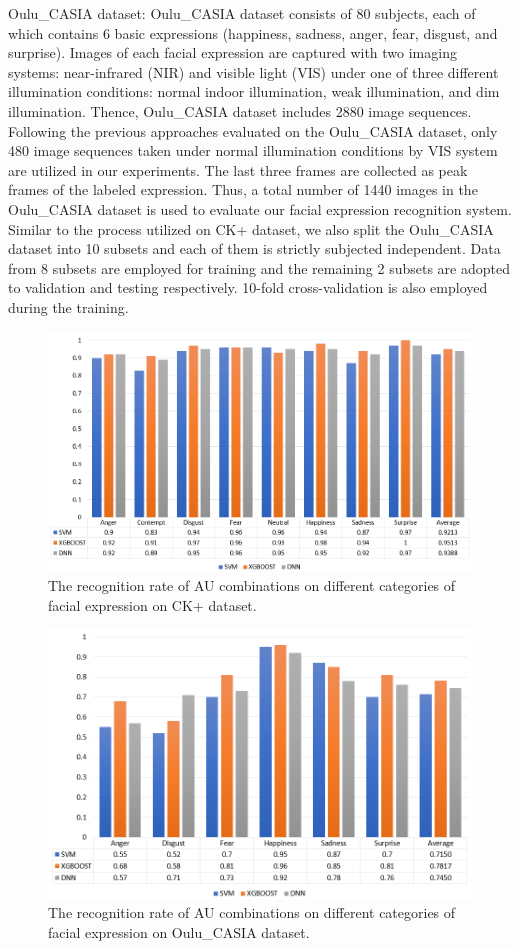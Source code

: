 \documentclass[10pt, conference, compsocconf]{IEEEtran}
\begin{document}
Oulu\_CASIA dataset: Oulu\_CASIA dataset\cite{Zhao2011Facial} consists of 80 subjects, each of which contains 6 basic expressions  (happiness, sadness, anger, fear, disgust, and surprise). Images of each facial expression are captured with two imaging systems: near-infrared (NIR) and visible light (VIS) under one of three different illumination conditions: normal indoor illumination, weak illumination, and dim illumination. Thence, Oulu\_CASIA dataset includes 2880 image sequences. Following the previous approaches evaluated on the Oulu\_CASIA dataset, only 480 image sequences taken under normal illumination conditions by VIS system are utilized in our experiments. The last three frames are collected as peak frames of the labeled expression. Thus, a total number of 1440 images in the Oulu\_CASIA dataset is used to evaluate our facial expression recognition system. Similar to the process utilized on CK+ dataset, we also split the Oulu\_CASIA dataset into 10 subsets and each of them is strictly subjected independent. Data from 8 subsets are employed for training and the remaining 2 subsets are adopted to validation and testing respectively. 10-fold cross-validation is also employed during the training.

\begin{figure}[h]
	\centering
	\includegraphics[width=\linewidth]{figureck}
	\caption{The recognition rate of AU combinations on different categories of facial expression on CK+ dataset.}
\end{figure}
\begin{figure}[h]
	\centering
	\includegraphics[width=\linewidth]{figureoulu}
	\caption{The recognition rate of AU combinations on different categories of facial expression on Oulu\_CASIA dataset.}
\end{figure}
\end{document}
